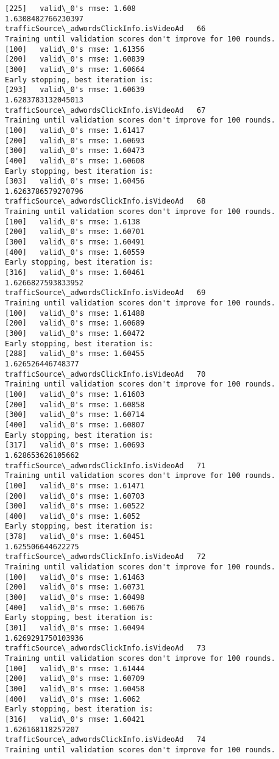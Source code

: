 \documentclass[11pt]{article}
\begin{document}
\begin{Verbatim}[commandchars=\\\{\}]
[225]	valid\_0's rmse: 1.608
1.6308482766230397
trafficSource\_adwordsClickInfo.isVideoAd   66
Training until validation scores don't improve for 100 rounds.
[100]	valid\_0's rmse: 1.61356
[200]	valid\_0's rmse: 1.60839
[300]	valid\_0's rmse: 1.60664
Early stopping, best iteration is:
[293]	valid\_0's rmse: 1.60639
1.6283783132045013
trafficSource\_adwordsClickInfo.isVideoAd   67
Training until validation scores don't improve for 100 rounds.
[100]	valid\_0's rmse: 1.61417
[200]	valid\_0's rmse: 1.60693
[300]	valid\_0's rmse: 1.60473
[400]	valid\_0's rmse: 1.60608
Early stopping, best iteration is:
[303]	valid\_0's rmse: 1.60456
1.6263786579270796
trafficSource\_adwordsClickInfo.isVideoAd   68
Training until validation scores don't improve for 100 rounds.
[100]	valid\_0's rmse: 1.6138
[200]	valid\_0's rmse: 1.60701
[300]	valid\_0's rmse: 1.60491
[400]	valid\_0's rmse: 1.60559
Early stopping, best iteration is:
[316]	valid\_0's rmse: 1.60461
1.6266827593833952
trafficSource\_adwordsClickInfo.isVideoAd   69
Training until validation scores don't improve for 100 rounds.
[100]	valid\_0's rmse: 1.61488
[200]	valid\_0's rmse: 1.60689
[300]	valid\_0's rmse: 1.60472
Early stopping, best iteration is:
[288]	valid\_0's rmse: 1.60455
1.626526446748377
trafficSource\_adwordsClickInfo.isVideoAd   70
Training until validation scores don't improve for 100 rounds.
[100]	valid\_0's rmse: 1.61603
[200]	valid\_0's rmse: 1.60858
[300]	valid\_0's rmse: 1.60714
[400]	valid\_0's rmse: 1.60807
Early stopping, best iteration is:
[317]	valid\_0's rmse: 1.60693
1.628653626105662
trafficSource\_adwordsClickInfo.isVideoAd   71
Training until validation scores don't improve for 100 rounds.
[100]	valid\_0's rmse: 1.61471
[200]	valid\_0's rmse: 1.60703
[300]	valid\_0's rmse: 1.60522
[400]	valid\_0's rmse: 1.6052
Early stopping, best iteration is:
[378]	valid\_0's rmse: 1.60451
1.625506644622275
trafficSource\_adwordsClickInfo.isVideoAd   72
Training until validation scores don't improve for 100 rounds.
[100]	valid\_0's rmse: 1.61463
[200]	valid\_0's rmse: 1.60731
[300]	valid\_0's rmse: 1.60498
[400]	valid\_0's rmse: 1.60676
Early stopping, best iteration is:
[301]	valid\_0's rmse: 1.60494
1.6269291750103936
trafficSource\_adwordsClickInfo.isVideoAd   73
Training until validation scores don't improve for 100 rounds.
[100]	valid\_0's rmse: 1.61444
[200]	valid\_0's rmse: 1.60709
[300]	valid\_0's rmse: 1.60458
[400]	valid\_0's rmse: 1.6062
Early stopping, best iteration is:
[316]	valid\_0's rmse: 1.60421
1.626168118257207
trafficSource\_adwordsClickInfo.isVideoAd   74
Training until validation scores don't improve for 100 rounds.

\end{Verbatim}
\end{document}
